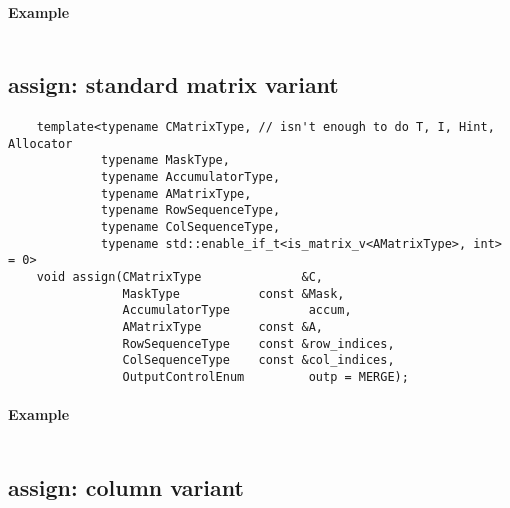 \paragraph{Example}

\begin{verbatim}

\end{verbatim}

\subsection{{\sf assign}: standard matrix variant}

\paragraph{\syntax}

\begin{verbatim}
    template<typename CMatrixType, // isn't enough to do T, I, Hint, Allocator
             typename MaskType,
             typename AccumulatorType,
             typename AMatrixType,
             typename RowSequenceType,
             typename ColSequenceType,
             typename std::enable_if_t<is_matrix_v<AMatrixType>, int> = 0>
    void assign(CMatrixType              &C,
                MaskType           const &Mask,
                AccumulatorType           accum,
                AMatrixType        const &A,
                RowSequenceType    const &row_indices,
                ColSequenceType    const &col_indices,
                OutputControlEnum         outp = MERGE);
\end{verbatim}


\paragraph{Example}

\begin{verbatim}

\end{verbatim}


\subsection{{\sf assign}: column variant}

\paragraph{\syntax}

